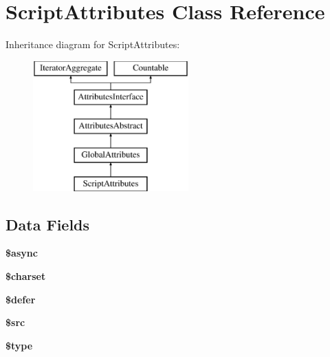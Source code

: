 \hypertarget{class_pes_1_1_dom_1_1_node_1_1_attributes_1_1_script_attributes}{}\section{Script\+Attributes Class Reference}
\label{class_pes_1_1_dom_1_1_node_1_1_attributes_1_1_script_attributes}
Inheritance diagram for Script\+Attributes\+:\begin{figure}[H]
\begin{center}
\leavevmode
\includegraphics[height=5.000000cm]{class_pes_1_1_dom_1_1_node_1_1_attributes_1_1_script_attributes}
\end{center}
\end{figure}
\subsection*{Data Fields}
\begin{DoxyCompactItemize}
\item 
\mbox{\label{class_pes_1_1_dom_1_1_node_1_1_attributes_1_1_script_attributes_a3974a351d8a18df695923d4021e1f136}} 
{\bfseries \$async}
\item 
\mbox{\label{class_pes_1_1_dom_1_1_node_1_1_attributes_1_1_script_attributes_af10158dd74b75f1d337e83102d6b82ce}} 
{\bfseries \$charset}
\item 
\mbox{\label{class_pes_1_1_dom_1_1_node_1_1_attributes_1_1_script_attributes_af035ee3a0e66d50f2a013040b1d320b8}} 
{\bfseries \$defer}
\item 
\mbox{\label{class_pes_1_1_dom_1_1_node_1_1_attributes_1_1_script_attributes_a973baaba285951225df769fc7a6655bf}} 
{\bfseries \$src}
\item 
\mbox{\label{class_pes_1_1_dom_1_1_node_1_1_attributes_1_1_script_attributes_a9a4a6fba2208984cabb3afacadf33919}} 
{\bfseries \$type}
\end{DoxyCompactItemize}
